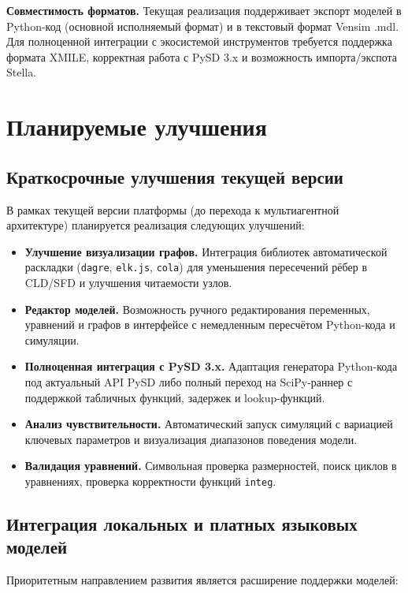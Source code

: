 \textbf{Совместимость форматов.} Текущая реализация поддерживает экспорт моделей в Python-код (основной исполняемый формат) и в текстовый формат Vensim .mdl. Для полноценной интеграции с экосистемой инструментов требуется поддержка формата XMILE, корректная работа с PySD 3.x и возможность импорта/экспота Stella.


\section{Планируемые улучшения}

\subsection{Краткосрочные улучшения текущей версии}

В рамках текущей версии платформы (до перехода к мультиагентной архитектуре) планируется реализация следующих улучшений:

\begin{itemize}
    \item \textbf{Улучшение визуализации графов.} Интеграция библиотек автоматической раскладки (\texttt{dagre}, \texttt{elk.js}, \texttt{cola}) для уменьшения пересечений рёбер в CLD/SFD и улучшения читаемости узлов.
    \item \textbf{Редактор моделей.} Возможность ручного редактирования переменных, уравнений и графов в интерфейсе с немедленным пересчётом Python-кода и симуляции.
    \item \textbf{Полноценная интеграция с PySD 3.x.} Адаптация генератора Python-кода под актуальный API PySD либо полный переход на SciPy-раннер с поддержкой табличных функций, задержек и lookup-функций.
    \item \textbf{Анализ чувствительности.} Автоматический запуск симуляций с вариацией ключевых параметров и визуализация диапазонов поведения модели.
    \item \textbf{Валидация уравнений.} Символьная проверка размерностей, поиск циклов в уравнениях, проверка корректности функций \texttt{integ}.
\end{itemize}

\subsection{Интеграция локальных и платных языковых моделей}

Приоритетным направлением развития является расширение поддержки моделей:

